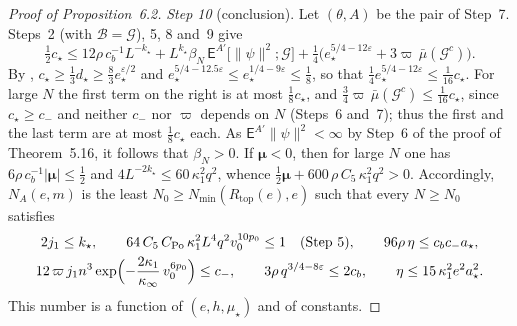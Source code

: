\documentclass[11pt]{amsart}
\theoremstyle{definition}
\begin{document}
\begin{proof}[Proof of Proposition~6.2]
\emph{Step 10} (conclusion).
Let $(\theta,A)$ be the pair of Step~7.
Steps~2 (with $\mathcal B=\mathcal G$), 5, 8 and~9 give
\begin{equation*}
\tfrac12c_\star\le12\rho\,c_b^{-1}L^{-k_\star}+L^{k_\star}\beta_N\,\mathsf E^{A'}\bigl[\|\psi\|^2;\mathcal G\bigr]+\tfrac14\bigl(e_\star^{5/4-12\varepsilon}+3\varpi\,\bar\mu(\mathcal G^c)\bigr).
\end{equation*}
By \cite[(T2)]{QEDIII}, $c_\star\ge\frac13d_\star\ge\frac83e_\star^{\varepsilon/2}$ and $e_\star^{5/4-12.5\varepsilon}\le e_\star^{1/4-9\varepsilon}\le\frac18$, so that $\frac14e_\star^{5/4-12\varepsilon}\le\frac1{16}c_\star$.
For large $N$ the first term on the right is at most $\frac18c_\star$, and $\frac34\varpi\,\bar\mu(\mathcal G^c)\le\frac1{16}c_\star$, since $c_\star\ge c_-$ and neither $c_-$ nor $\varpi$ depends on $N$ (Steps~6 and~7);
thus the first and the last term are at most $\frac18c_\star$ each.
As $\mathsf E^{A'}\|\psi\|^2<\infty$ by Step~6 of the proof of Theorem~5.16, it follows that $\beta_N>0$.
If $\boldsymbol\mu<0$, then for large $N$ one has $6\rho\,c_b^{-1}|\boldsymbol\mu|\le\frac12$ \cite[Proposition~28.3\,(d)]{QEDIII} and $4L^{-2k_\star}\le60\,\kappa_1^2q^2$, whence $\frac12\boldsymbol\mu+600\,\rho\,C_5\,\kappa_1^2q^2>0$.
Accordingly, $N_A(e,m)$ is the least $N_0\ge N_{\min}(R_{\mathrm{top}}(e),e)$ such that every $N\ge N_0$ satisfies
\begin{gather*}
2j_1\le k_\star,\qquad64\,C_5\,C_{\mathrm{Po}}\,\kappa_1^2L^4q^2v_0^{10p_0}\le1\quad\text{(Step~5)},\qquad96\rho\,\eta\le c_bc_-a_\star,\\
12\,\varpi\,j_1n^3\exp\Bigl(-\frac{2\kappa_1}{\kappa_\infty}\,v_0^{6p_0}\Bigr)\le c_-,\qquad3\rho\,q^{3/4-8\varepsilon}\le2c_b,\qquad\eta\le15\,\kappa_1^2e^2a_\star^2 .
\end{gather*}
This number is a function of $(e,h,\mu_\star)$ and of constants.
\end{proof}
\end{document}
